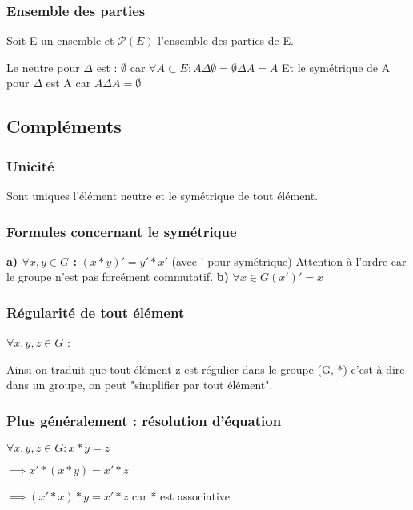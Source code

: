 \documentclass[12pt,a4paper,french]{book}
\begin{document}
\begin{spacing}{1.0}
			\subsubsection{Ensemble des parties}
			\begin{spacing}{1.0}
				Soit E un ensemble et \(\mathscr{P}(E)\) l'ensemble des parties de E.
				\begin{center}
				\end{center}
				Le neutre pour \(\Delta\) est  : \(\emptyset\) car \(\forall A \subset E : A \Delta \emptyset = \emptyset \Delta A = A\)
				Et le symétrique de A pour \(\Delta\) est A car \(A \Delta A = \emptyset\)
			\end{spacing}
		\subsection{Compléments}
			\subsubsection{Unicité}
			Sont uniques l'élément neutre et le symétrique de tout élément.
			\subsubsection{Formules concernant le symétrique}
			\textbf{a) \(\forall x,y \in G\) :}
			\((x * y)' = y' * x'\) (avec ' pour symétrique)
			Attention à l'ordre car le groupe n'est pas forcément commutatif.
			\textbf{b)} \(\forall x \in G (x')' = x\)
			\subsubsection{Régularité de tout élément}
			\(\forall x, y, z \in G \) : 
			
			Ainsi on traduit que tout élément z est régulier dans le groupe (G, *) c'est à dire dans un groupe, on peut "simplifier par tout élément".
			\subsubsection{Plus généralement : résolution d'équation}
			\(\forall x, y, z \in G : x * y = z\)
			
			\(\implies x' * (x * y) = x' * z\)
			
			\(\implies (x' * x) * y = x' * z\) car * est associative
			

\end{spacing}
\end{document}
